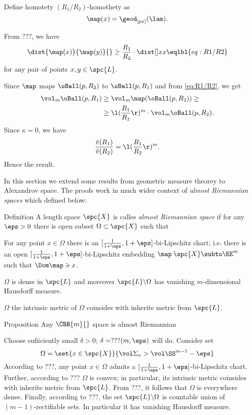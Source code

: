 Define homotety $(R_1/R_2)$-homothety
as 
$$\map(x)=\geod_{[px]}(\lam).$$

From ???, we have 
$$\dist{\map(x)}{\map(y)}{}
\ge
\frac{R_1}{R_2}\cdot\dist[{{}}]{x}{x}{}\eqlbl{eq:R1/R2}$$
for any pair of points $x,y\in\spc{L}$.

Since $\map$ maps $\oBall(p,R_2)$ to $\oBall(p,R_1)$ and from \ref{eq:R1/R2},
we get
\begin{align*}
\vol_m\oBall(p,R_1)
&\ge
\vol_m\map(\oBall(p,R_2))
\ge
\\
&\ge 
\l(\frac{R_1}{R_2}\r)^m
\cdot
\vol_m\oBall(p,R_2).
\end{align*}
Since $\kappa=0$, we have 
$$\frac{\tilde v(R_1)}{\tilde v(R_2)}=\l(\frac{R_1}{R_2}\r)^m.$$
Hence the result.\qeds









In this section we extend some results from geometric measure theorey to Alexandrov space.
The proofs work in much wider context of \emph{almost Riemannian spaces} which defined below:

\begin{thm}{Definition}
A length space $\spc{X}$ is calles \emph{almost Riemannian space}
if for any $\eps>0$ there is open subset $\Omega\subset \spc{X}$ such that 
\begin{subthm}{}
For any point $x\in\Omega$ there is an $[\tfrac1{1+\eps},1+\eps]$-bi-Lipschitz chart;
i.e. there is an open $[\tfrac1{1+\eps},1+\eps]$-bi-Lipschitz embedding $\map\:\spc{X}\subto\EE^m$ such that $\Dom\map\ni x$.
\end{subthm}{}

\begin{subthm}{}
$\Omega$ is dense in $\spc{L}$ and moreover $\spc{L}\backslash\Omega$ has vanishing $m$-dimensional Hausdorff measure.
\end{subthm}{}

\begin{subthm}{}
 $\Omega$ the intrinsic metric of $\Omega$ coinsides with inherite metric from $\spc{L}$.
\end{subthm}
\end{thm}


\begin{thm}{Proposition}
Any $\CBB{m}{}$ space is almost Riemannian
\end{thm}

Choose sufiiciently small $\delta>0$; $\delta=???(m,\eps)$ will do.
Consider set 
$$\Omega=\set{x\in\spc{X}}{\vol\Sigma_x>\vol\SS^{m-1}-\eps}$$
According to ???, any point $x\in\Omega$ admits a $[\tfrac1{1+\eps},1+\eps]$-bi-Lipschitz chart.
Further, according to ??? $\Omega$ is convex; 
in particular, its intrinsic metric coinsides with inherite metric from $\spc{L}$.
From ???, it follows that $\Omega$ is everywhere dense.
Finally, according to ???, the set $\spc{L}\backslash\Omega$ is countable union of $(m-1)$-rectifiable sets.
In particular it has vanishing Hausdorff measure.  \qeds

